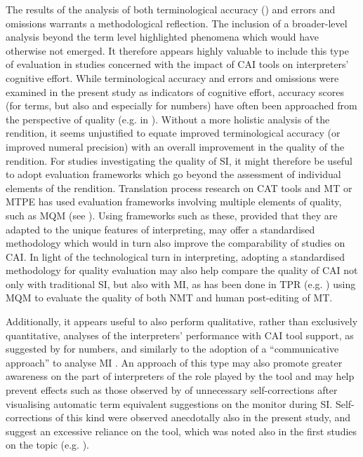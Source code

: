 The results of the analysis of both terminological accuracy () and errors and omissions warrants a methodological reflection. The inclusion of a broader-level analysis beyond the term level highlighted phenomena which would have otherwise not emerged. It therefore appears highly valuable to include this type of evaluation in studies concerned with the impact of CAI tools on interpreters' cognitive effort. While terminological accuracy and errors and omissions were examined in the present study as indicators of cognitive effort, accuracy scores (for terms, but also and especially for numbers) have often been approached from the perspective of quality (e.g. in \citealt{defrancq_automatic_2020}). Without a more holistic analysis of the rendition, it seems unjustified to equate improved terminological accuracy (or improved numeral precision) with an overall improvement in the quality of the rendition. For studies investigating the quality of SI, it might therefore be useful to adopt evaluation frameworks which go beyond the assessment of individual elements of the rendition. Translation process research on CAT tools and MT or MTPE has used evaluation frameworks involving multiple elements of quality, such as MQM (see ). Using frameworks such as these, provided that they are adapted to the unique features of interpreting, may offer a standardised methodology which would in turn also improve the comparability of studies on CAI. In light of the technological turn \citep{fantinuoli2018interpreting} in interpreting, adopting a standardised methodology for quality evaluation may also help compare the quality of CAI not only with traditional SI, but also with MI, as has been done in TPR (e.g. \citealt{vardaro_translation_2019}) using MQM to evaluate the quality of both NMT and human post-editing of MT.

Additionally, it appears useful to also perform qualitative, rather than exclusively quantitative, analyses of the interpreters' performance with CAI tool support, as suggested by \citet{frittella_cai-supported_2021} for numbers, and similarly to the adoption of a ``communicative approach'' to analyse MI \citep{fantinuoli2021evaluation}. An approach of this type may also promote greater awareness on the part of interpreters of the role played by the tool and may help prevent effects such as those observed by \citet[123]{van_cauwenberghe_etude_2020} of unnecessary self-corrections after visualising automatic term equivalent suggestions on the monitor during SI. Self-corrections of this kind were observed anecdotally also in the present study, and suggest an excessive reliance on the tool, which was noted also in the first studies on the topic (e.g. \citealt{biagini_glossario_2015,prandi_uso_2015,prandi_use_2015}).

